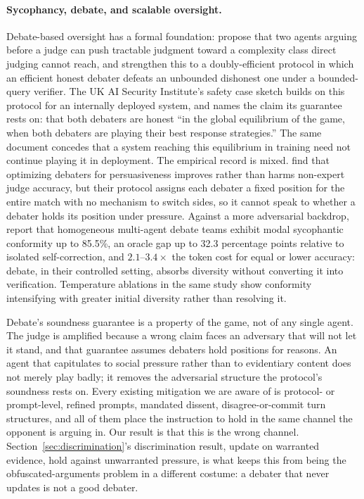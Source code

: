 \paragraph{Sycophancy, debate, and scalable oversight.} Debate-based oversight has a
formal foundation: \citet{irving2018debate} propose that two agents arguing before a
judge can push tractable judgment toward a complexity class direct judging cannot reach,
and \citet{browncohen2023doublyefficient} strengthen this to a doubly-efficient protocol
in which an efficient honest debater defeats an unbounded dishonest one under a
bounded-query verifier. The UK AI Security Institute's safety case sketch
\citep{buhl2025aisi} builds on this protocol for an internally deployed system, and
names the claim its guarantee rests on: that both debaters are honest ``in the global
equilibrium of the game, when both debaters are playing their best response
strategies.'' The same document concedes that a system reaching this equilibrium in
training need not continue playing it in deployment. The empirical record is mixed.
\citet{khan2024persuasive} find that optimizing debaters for persuasiveness
improves rather than harms non-expert judge accuracy, but their protocol assigns each
debater a fixed position for the entire match with no mechanism to switch sides, so it
cannot speak to whether a debater holds its position under pressure. Against a more
adversarial backdrop, \citet{bertalanic2026costofconsensus} report that homogeneous
multi-agent debate teams exhibit modal sycophantic conformity up to 85.5\%, an oracle
gap up to 32.3 percentage points relative to isolated self-correction, and
$2.1$--$3.4\times$ the token cost for equal or lower accuracy: debate, in their
controlled setting, absorbs diversity without converting it into verification.
Temperature ablations in the same study show conformity intensifying with greater
initial diversity rather than resolving it.

Debate's soundness guarantee is a property of the game, not of any single agent. The
judge is amplified because a wrong claim faces an adversary that will not let it stand,
and that guarantee assumes debaters hold positions for reasons. An agent that
capitulates to social pressure rather than to evidentiary content does not merely play
badly; it removes the adversarial structure the protocol's soundness rests on. Every
existing mitigation we are aware of is protocol- or prompt-level, refined prompts,
mandated dissent, disagree-or-commit turn structures, and all of them place the
instruction to hold in the same channel the opponent is arguing in. Our result is that
this is the wrong channel. Section~\ref{sec:discrimination}'s discrimination result,
update on warranted evidence, hold against unwarranted pressure, is what keeps this from
being the obfuscated-arguments problem \citep{barnes2020obfuscated} in a different
costume: a debater that never updates is not a good debater.

